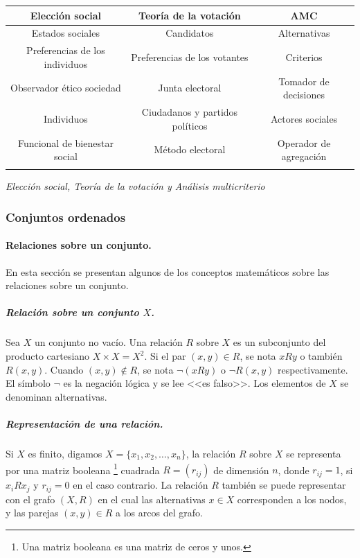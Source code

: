 \documentclass[a5paper,doc,10pt,noapacite]{apa6}
\begin{document}
{{	
	\begin{center}
	\fontsize{7}{11}\selectfont
	\begin{tabular}{c  c c }
		\thickline
		\textbf{Elección social} & \textbf{Teoría de la votación}  & \textbf{AMC} \\	\hline
		 Estados sociales & Candidatos & Alternativas\\
		 Preferencias de los individuos & Preferencias de los votantes & Criterios\\
		 Observador ético \/ sociedad & Junta electoral & Tomador de decisiones \\
		 Individuos & Ciudadanos y partidos políticos & Actores sociales\\
		 Funcional de bienestar social & Método electoral & Operador de agregación\\
		\thickline
		\\[3em]
	\end{tabular}
	\label{tab:B1}

	\emph{Elección social, Teoría de la votación y Análisis multicriterio}
	\end{center}

	\subsubsection{Conjuntos ordenados}

\paragraph{Relaciones sobre un conjunto.}
En esta sección se presentan algunos de los conceptos matemáticos sobre las relaciones sobre un conjunto.

\subparagraph{Relación sobre un conjunto \(X\).}

Sea \(X\) un conjunto no vacío. Una relación \(R\) sobre  \(X\) es un subconjunto del producto cartesiano \(X \times X = X^2\). Si el par \((x,y) \in R\), se nota \(xRy\) o también \(R(x,y)\). Cuando \((x,y) \not \in R\), se nota \(\neg (xRy)\) o \(\neg R(x,y)\) respectivamente. El
símbolo \(\neg\) es la negación lógica y se lee <<es falso>>. Los elementos de \(X\) se denominan alternativas.

\subparagraph{Representación de una relación.}

Si \(X\) es finito, digamos \(X = \{x_1, x_2, \dots , x_n \}\), la relación \(R\) sobre \(X\) se representa por una matriz booleana \footnote{Una matriz booleana es una matriz de ceros y unos.} cuadrada \(R = (r_{ij})\) de dimensión \(n\), donde \(r_{ij} = 1\), si \(x_i R x_j \text{ y } r_{ij} = 0\) en el caso contrario. La relación \(R\) también se puede representar con el grafo \((X,R)\) en el cual las alternativas \(x \in X\) corresponden a los nodos, y las parejas \((x,y) \in R\) a los arcos del grafo.

}}
\end{document}
